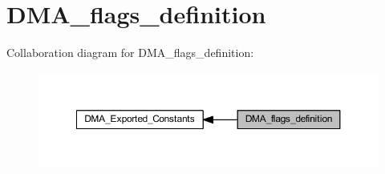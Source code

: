 \hypertarget{group___d_m_a__flags__definition}{}\section{D\+M\+A\+\_\+flags\+\_\+definition}
\label{group___d_m_a__flags__definition}
Collaboration diagram for D\+M\+A\+\_\+flags\+\_\+definition\+:
\nopagebreak
\begin{figure}[H]
\begin{center}
\leavevmode
\includegraphics[width=350pt]{group___d_m_a__flags__definition}
\end{center}
\end{figure}
